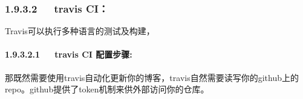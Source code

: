 \documentclass[letterpaper,12pt,english]{sphinxmanual}
\begin{document}
\subsubsection{1.9.3.2   travis CI：}
\label{\detokenize{001software/001install/001._u7f51_u7ad9/hexo:travis-ci}}
Travis可以执行多种语言的测试及构建， 



\paragraph{1.9.3.2.1   travis CI 配置步骤:}
\label{\detokenize{001software/001install/001._u7f51_u7ad9/hexo:id23}}
那既然需要使用travis自动化更新你的博客，travis自然需要读写你的github上的repo。github提供了token机制来供外部访问你的仓库。
\end{document}
